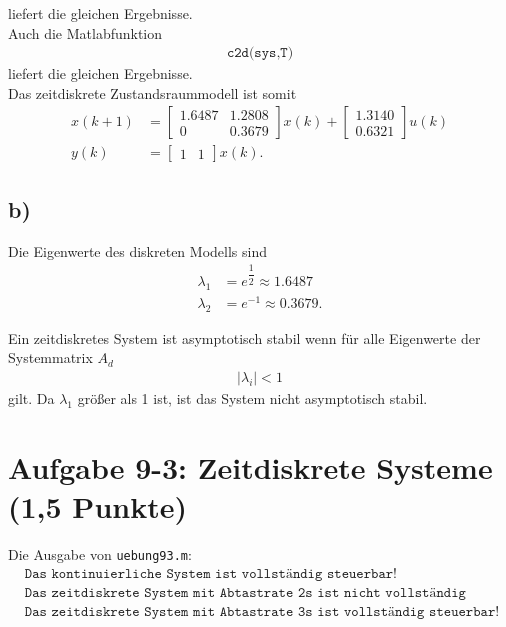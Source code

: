 \documentclass[11pt]{scrartcl} %
\begin{document}
liefert die gleichen Ergebnisse.\\

Auch die Matlabfunktion
\begin{align*}
\texttt{c2d(sys,T)}
\end{align*}
liefert die gleichen Ergebnisse.\\

Das zeitdiskrete Zustandsraummodell ist somit
\begin{align*}
x\left(k+1\right) &= \begin{bmatrix}
1.6487 & 1.2808 \\
0 & 0.3679
\end{bmatrix} x\left(k\right) + \begin{bmatrix}
1.3140 \\
0.6321
\end{bmatrix} u\left(k\right) \\
y\left(k\right) &= \begin{bmatrix}
1 & 1
\end{bmatrix} x\left(k\right).
\end{align*}


\subsection*{b)}
Die  Eigenwerte des diskreten Modells sind
\begin{align*}
\lambda_1 &= e^{\dfrac{1}{2}} \approx 1.6487 \\
\lambda_2 &= e^{-1} \approx 0.3679.
\end{align*}

Ein zeitdiskretes System ist asymptotisch stabil wenn für alle Eigenwerte der Systemmatrix $A_d$
\begin{align*}
\left|\lambda_i \right| < 1
\end{align*}
gilt. Da $\lambda_1$ größer als 1 ist, ist das System nicht asymptotisch stabil.


\section*{Aufgabe 9-3: Zeitdiskrete Systeme (1,5 Punkte)}
Die Ausgabe von \verb+uebung93.m+:
\begin{align*}
&\texttt{Das kontinuierliche System ist vollständig steuerbar!} \\
&\texttt{Das zeitdiskrete System mit Abtastrate 2s ist nicht vollständig steuerbar!} \\
&\texttt{Das zeitdiskrete System mit Abtastrate 3s ist vollständig steuerbar!}
\end{align*}
\end{document}
